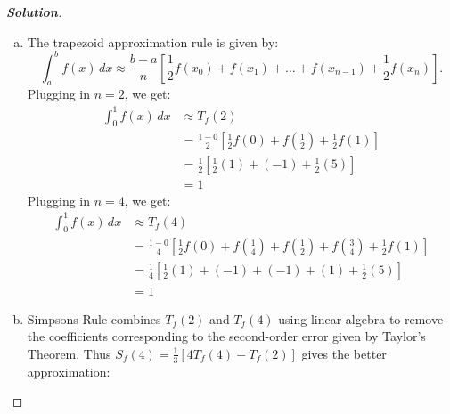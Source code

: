 \documentclass[11pt]{article}
\newenvironment{solution}{%
  \begin{proof}[\textbf{Solution}]$ $\par\nobreak\ignorespaces
}{%
  \end{proof}
}
\theoremstyle{definition}
\begin{document}
\begin{solution}
\begin{enumerate}[(a)]
\begin{align*}
    y &= \begin{bmatrix*}18/5 \\ -1/3\end{bmatrix*} \\
    \begin{bmatrix*}1 & 6/5 \\ 0 & 1\end{bmatrix*}\begin{bmatrix*}a \\ b\end{bmatrix*} &= \begin{bmatrix*}18/5 \\ -1/3\end{bmatrix*} \\
    \begin{bmatrix*}a \\ b\end{bmatrix*} &= \begin{bmatrix*}4 \\ -1/3\end{bmatrix*}
\end{align*}
Thus the best linear approximation is given by $f(x) = 4x - 1/3$. Integrating $\int_0^1 4x - 1/3 \, dx = 2x^2 - (1/3)x \bigg\vert_0^1 = 5/3$.
\item The trapezoid approximation rule is given by: $$\int_a^b f(x) \, dx \approx \frac{b - a}{n}[\frac{1}{2}f(x_0) + f(x_1) + \ldots + f(x_{n-1}) + \frac{1}{2}f(x_n)].$$
Plugging in $n = 2$, we get:
\begin{align*}
    \int_0^1 f(x) \, dx &\approx T_f(2) \\
    &= \frac{1 - 0}{2}[\frac{1}{2}f(0) + f(\frac{1}{2}) + \frac{1}{2}f(1)] \\
    &= \frac{1}{2}[\frac{1}{2}(1) + (-1) + \frac{1}{2}(5)] \\
    &= 1
\end{align*}
Plugging in $n = 4$, we get:
\begin{align*}
    \int_0^1 f(x) \, dx &\approx T_f(4) \\
    &=\frac{1 - 0}{4}[\frac{1}{2}f(0) + f(\frac{1}{4}) + f(\frac{1}{2}) + f(\frac{3}{4}) +  \frac{1}{2}f(1)] \\
    &= \frac{1}{4}[\frac{1}{2}(1) + (-1) + (-1) + (1) + \frac{1}{2}(5)] \\
    &= 1
\end{align*}
\item Simpsons Rule combines $T_f(2)$ and $T_f(4)$ using linear algebra to remove the coefficients corresponding to the second-order error given by Taylor's Theorem. Thus $S_f(4) = \frac{1}{3}[4T_f(4) - T_f(2)]$ gives the better approximation:

\end{enumerate}
\end{solution}
\end{document}
